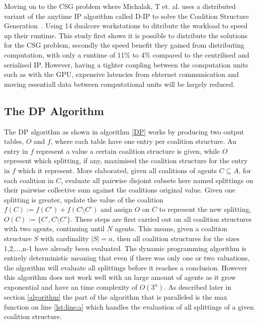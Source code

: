 \documentclass{llncs}
\begin{document}
Moving on to the CSG problem where Michalak, T et. al. uses a distributed variant of the anytime IP algorithm called
D-IP to solve the Coalition Structure Generation~\cite{michalak2010distributed}.
Using 14 dualcore workstations to ditribute the workload to speed up their runtime.
This study first shows it is possible to distribute the solutions for the CSG problem,
secondly the speed benefit they gained from distributing computation, 
with only a runtime of 11\% to 4\%  compared to the centrilised and serialised IP.
However, having a tighter coupling between the computation units such as with the GPU, 
expensive latencies from ehternet communication and moving essentiall data between computational units will be largely reduced.



\subsection{The {DP} Algorithm} 


The DP algorithm as shown in algorithm \ref{DP} works by producing two output tables, $O$ and $f$, 
where each table have one entry per coalition structure. 
An entry in $f$ represent a value a certain coalition structure is given, 
while $O$ represent which splitting, if any, maximised the coalition structure for the entry in $f$ which it represent.
More elaborated, given all coalitions of agents $C\subseteq A$, for each coalition in $C$, evaluate all
pairwise disjoint subsets here named splittings on their pairwise collective sum against the coalitions
original value. Given one splitting is greater, update the value of the coalition $f(C) := f(C') + f(C\setminus C')$
and assign $O$ on $C$ to represent the new splitting, $O(C) := \{C',C\setminus C'\}$. These steps are first carried out
on all coalition structures with two agents, continuing until $N$ agents. 
This means, given a coalition structure $S$ with cardinality $|S| = n$, then all coalition structures
for the sizes 1,2,...,n-1 have already been evaluated. The dynamic programming algorithm is entirely deterministic meaning
that even if there was only one or two valuations, the algorithm will evaluate all splittings before it reaches a conclusion.
However this algorithm does not work well with an large amount of agents as it grow exponential and have an time complexity of $O(3^n)$.
As described later in section \ref{algorithm} the part of the algorithm that is paralleled is the max function on line \ref{lst:line:a}
which handles the evaluation of all splittings of a given coalition structure.
\end{document}
